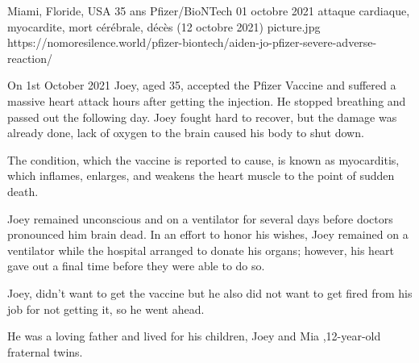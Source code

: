           {Miami, Floride, USA}
          {35 ans}
          {Pfizer/BioNTech}
          {01 octobre 2021}
          {attaque cardiaque, myocardite, mort cérébrale, décès (12 octobre 2021)}
          {picture.jpg}
          {https://nomoresilence.world/pfizer-biontech/aiden-jo-pfizer-severe-adverse-reaction/}
          {

On 1st October 2021 Joey, aged 35, accepted the Pfizer Vaccine and suffered a
massive heart attack hours after getting the injection. He stopped breathing and
passed out the following day. Joey fought hard to recover, but the damage was
already done, lack of oxygen to the brain caused his body to shut down.

The condition, which the vaccine is reported to cause, is known as myocarditis,
which inflames, enlarges, and weakens the heart muscle to the point of sudden
death.

Joey remained unconscious and on a ventilator for several days before doctors
pronounced him brain dead. In an effort to honor his wishes, Joey remained on a
ventilator while the hospital arranged to donate his organs; however, his heart
gave out a final time before they were able to do so.

Joey, didn’t want to get the vaccine but he also did not want to get fired from
his job for not getting it, so he went ahead.

He was a loving father and lived for his children, Joey and Mia ,12-year-old
fraternal twins.

}
